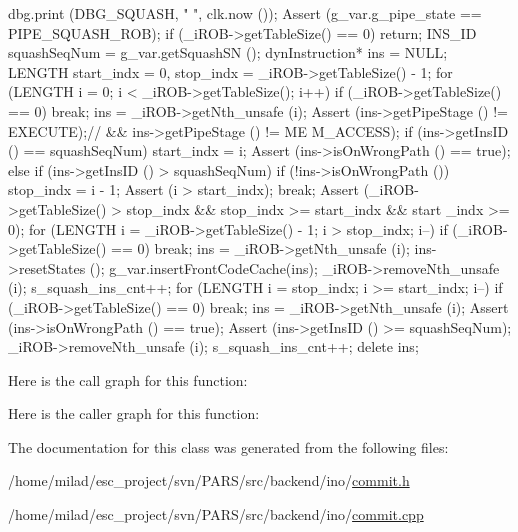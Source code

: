 \begin{DoxyCode}
                                  {
    dbg.print (DBG_SQUASH, "%
      ", clk.now ());
    Assert (g_var.g_pipe_state == PIPE_SQUASH_ROB);
    if (_iROB->getTableSize() == 0) return;
    INS_ID squashSeqNum = g_var.getSquashSN ();
    dynInstruction* ins = NULL;
    LENGTH start_indx = 0, stop_indx = _iROB->getTableSize() - 1;
    for (LENGTH i = 0; i < _iROB->getTableSize(); i++) {
        if (_iROB->getTableSize() == 0) break;
        ins = _iROB->getNth_unsafe (i);
        Assert (ins->getPipeStage () != EXECUTE);// && ins->getPipeStage () != ME
      M_ACCESS);
        if (ins->getInsID () == squashSeqNum) {
            start_indx = i;
            Assert (ins->isOnWrongPath () == true);
        } else if (ins->getInsID () > squashSeqNum) {
            if (!ins->isOnWrongPath ()) {
                stop_indx = i - 1;
                Assert (i > start_indx);
                break;
            }
        }
    }
    Assert (_iROB->getTableSize() > stop_indx && stop_indx >= start_indx && start
      _indx >= 0);
    for (LENGTH i = _iROB->getTableSize() - 1; i > stop_indx; i--) {
        if (_iROB->getTableSize() == 0) break;
        ins = _iROB->getNth_unsafe (i);
        ins->resetStates ();
        g_var.insertFrontCodeCache(ins);
        _iROB->removeNth_unsafe (i);
        s_squash_ins_cnt++;
    }
    for (LENGTH i = stop_indx; i >= start_indx; i--) {
        if (_iROB->getTableSize() == 0) break;
        ins = _iROB->getNth_unsafe (i);
        Assert (ins->isOnWrongPath () == true);
        Assert (ins->getInsID () >= squashSeqNum);
        _iROB->removeNth_unsafe (i);
        s_squash_ins_cnt++;
        delete ins;
    }
}
\end{DoxyCode}


Here is the call graph for this function:




Here is the caller graph for this function:




The documentation for this class was generated from the following files:\begin{DoxyCompactItemize}
\item 
/home/milad/esc\_\-project/svn/PARS/src/backend/ino/\hyperlink{ino_2commit_8h}{commit.h}\item 
/home/milad/esc\_\-project/svn/PARS/src/backend/ino/\hyperlink{ino_2commit_8cpp}{commit.cpp}\end{DoxyCompactItemize}
